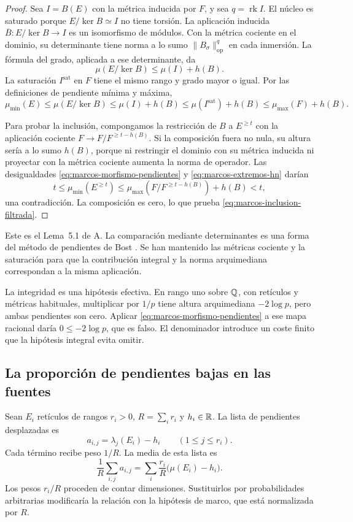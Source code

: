 \begin{proof}
Sea $I=B(E)$ con la métrica inducida por $F$, y sea $q=\operatorname{rk}I$.
El núcleo es saturado porque $E/\ker B\simeq I$ no tiene torsión.
La aplicación inducida $\overline B:E/\ker B\to I$ es un isomorfismo
de módulos. Con la métrica cociente en el dominio, su determinante
tiene norma a lo sumo $\|B_\sigma\|_{\mathrm{op}}^q$ en cada
inmersión. La fórmula del grado, aplicada a ese determinante, da
\[
 \mu(E/\ker B)\le\mu(I)+h(B).
\]
La saturación $I^{\mathrm{sat}}$ en $F$ tiene el mismo rango y grado
mayor o igual. Por las definiciones de pendiente mínima y máxima,
\[
 \mu_{\min}(E)\le\mu(E/\ker B)
 \le\mu(I)+h(B)\le\mu(I^{\mathrm{sat}})+h(B)
 \le\mu_{\max}(F)+h(B).
\]

Para probar la inclusión, compongamos la restricción de $B$ a
$E^{\ge t}$ con la aplicación cociente
$F\to F/F^{\ge t-h(B)}$. Si la composición fuera no nula, su
altura sería a lo sumo $h(B)$, porque ni restringir el dominio con
su métrica inducida ni proyectar con la métrica cociente aumenta
la norma de operador. Las desigualdades
\eqref{eq:marcos-morfismo-pendientes} y
\eqref{eq:marcos-extremos-hn} darían
\[
 t\le\mu_{\min}(E^{\ge t})
 \le\mu_{\max}(F/F^{\ge t-h(B)})+h(B)<t,
\]
una contradicción. La composición es cero, lo que prueba
\eqref{eq:marcos-inclusion-filtrada}.
\end{proof}

Este es el Lema~5.1 de A. La comparación mediante determinantes es
una forma del método de pendientes de Bost
\cite[§4.1.4, pp.~199--200]{bost-pendientes}. Se han mantenido
las métricas cociente y la saturación para que la contribución integral
y la norma arquimediana correspondan a la misma aplicación.

La integridad es una hipótesis efectiva. En rango uno sobre $\mathbb{Q}$, con
retículos y métricas habituales, multiplicar por $1/p$ tiene altura
arquimediana $-2\log p$, pero ambas pendientes son cero. Aplicar
\eqref{eq:marcos-morfismo-pendientes} a ese mapa racional daría
$0\le-2\log p$, que es falso. El denominador introduce un coste
finito que la hipótesis integral evita omitir.

\subsection{La proporción de pendientes bajas en las fuentes}

Sean $E_i$ retículos de rangos $r_i>0$, $R=\sum_i r_i$ y
$h_i\in\mathbb{R}$. La lista de pendientes desplazadas es
\[
 a_{i,j}=\lambda_j(E_i)-h_i\qquad(1\le j\le r_i).
\]
Cada término recibe peso $1/R$. La media de esta lista es
\begin{equation}
 \frac1R\sum_{i,j}a_{i,j}
 =\sum_i\frac{r_i}{R}\bigl(\mu(E_i)-h_i\bigr).
 \label{eq:marcos-media-fuentes}
\end{equation}
Los pesos $r_i/R$ proceden de contar dimensiones. Sustituirlos por
probabilidades arbitrarias modificaría la relación con la hipótesis
de marco, que está normalizada por $R$.

